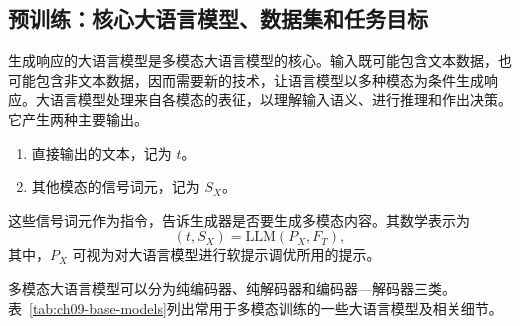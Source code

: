 \subsection{预训练：核心大语言模型、数据集和任务目标}
\label{sec:ch09-pretraining}
生成响应的大语言模型是多模态大语言模型的核心。输入既可能包含文本数据，也可能包含非文本数据，因而需要新的技术，让语言模型以多种模态为条件生成响应。大语言模型处理来自各模态的表征，以理解输入语义、进行推理和作出决策。它产生两种主要输出。
\begin{enumerate}
\item 直接输出的文本，记为 $t$。
\item 其他模态的信号词元，记为 $S_X$。
\end{enumerate}
这些信号词元作为指令，告诉生成器是否要生成多模态内容。其数学表示为
\begin{equation}
(t,S_X)=\mathrm{LLM}(P_X,F_T),
\label{eq:ch09-mmlm-output}
\end{equation}
其中，$P_X$ 可视为对大语言模型进行软提示调优所用的提示。

多模态大语言模型可以分为纯编码器、纯解码器和编码器—解码器三类。表~\ref{tab:ch09-base-models}列出常用于多模态训练的一些大语言模型及相关细节。

